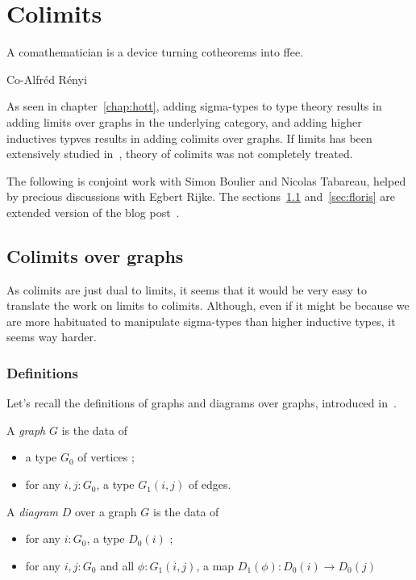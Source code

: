 
\chapter{Colimits}
\label{chap:colim}

\epigraph{A comathematician is a device turning cotheorems into
  ffee.}{Co-Alfréd Rényi}

As seen in chapter~\ref{chap:hott}, adding sigma-types to type theory
results in adding limits over graphs in the underlying category, and
adding higher inductives typves results in adding colimits over
graphs. If limits has been extensively studied in~\cite{lumsdaine},
theory of colimits was not completely treated.

The following is conjoint work with Simon Boulier and Nicolas
Tabareau, helped by precious discussions with Egbert Rijke.
The sections~\ref{sec:colim} and~\ref{sec:floris} are extended version
of the blog post~\cite{boulier}.

\section{Colimits over graphs}
\label{sec:colim}

As colimits are just dual to limits, it seems that it would be very
easy to translate the work on limits to colimits. Although, even if
it might be because we are more habituated to manipulate sigma-types
than higher inductive types, it seems way harder.

\subsection{Definitions}
\label{ssec:colim:defi}

Let's recall the definitions of graphs and diagrams over graphs,
introduced in~\cite{lumsdaine}.

\begin{defi}[Graph]\label{defi:graph}
  A {\em graph} $G$ is the data of
  \begin{itemize}
  \item a type $G_0$ of vertices ;
  \item for any $i,j:G_0$, a type $G_1(i,j)$ of edges.
  \end{itemize}
\end{defi}

\begin{defi}[Diagram]\label{defi:diagram}
  A {\em diagram} $D$ over a graph $G$ is the data of
  \begin{itemize}
  \item for any $i:G_0$, a type $D_0(i)$ ;
  \item for any $i,j:G_0$ and all $\phi : G_1(i,j)$, a map $D_1(\phi)
    : D_0(i) \to D_0(j)$
  \end{itemize}
\end{defi}

